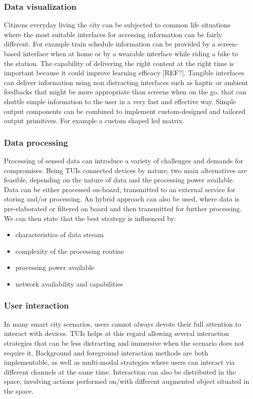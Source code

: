 \subsubsection{Data visualization}
Citizens everyday living the city can be subjected to common life situations where the most suitable interfaces for accessing information can be fairly different. For example train schedule information can be provided by a screen-based interface when at home or by a wearable interface while riding a bike to the station. The capability of delivering the right content at the right time is important because it could improve learning efficacy [REF?]. Tangible interfaces can deliver information using non distracting interfaces such as haptic or ambient feedbacks that might be more appropriate than screens when on the go. that can shuttle simple information to the user in a very fast and effective way.
Simple output components can be combined to implement custom-designed and tailored output primitives. For example a custom shaped led matrix.

\subsubsection{Data processing} %
Processing of sensed data can introduce a variety of challenges and demands for compromises. Being TUIs connected devices by nature, two main alternatives are feasible, depending on the nature of data and the processing power available. Data can be either processed on-board, transmitted to an external service for storing and/or processing. An hybrid approach can also be used, where data is pre-elaborated or filtered on board and then transmitted for further processing.
We can then state that the best strategy is influenced by:
\begin{itemize}
    \item characteristics of data stream
    \item complexity of the processing routine
    \item processing power available
    \item network availability and capabilities
\end{itemize}

\subsubsection{User interaction} %
In many smart city scenarios, users cannot always devote their full attention to interact with devices. TUIs helps at this regard allowing several interaction strategies that can be less distracting and immersive when the scenario does not require it.
Background and foreground interaction methods are both implementable, as well as multi-modal strategies where users can interact via different channels at the same time. Interaction can also be distributed in the space, involving actions performed on/with different augmented object situated in the space.

